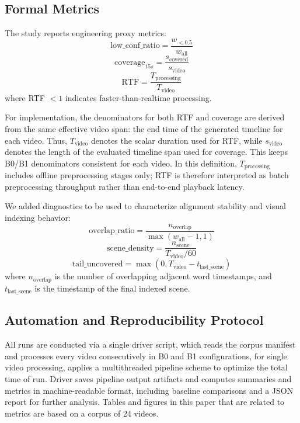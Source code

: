﻿﻿\documentclass[conference]{IEEEtran}
\begin{document}
\subsection{Formal Metrics}
The study reports engineering proxy metrics:
\begin{equation}
\text{low\_conf\_ratio} = \frac{w_{<0.5}}{w_{\text{all}}}
\end{equation}
\begin{equation}
\text{coverage}_{15s} = \frac{s_{\text{covered}}}{s_{\text{video}}}
\end{equation}
\begin{equation}
\text{RTF} = \frac{T_{\text{processing}}}{T_{\text{video}}}
\end{equation}
where RTF $< 1$ indicates faster-than-realtime processing.

For implementation, the denominators for both RTF and coverage are derived from the same effective video span: the end time of the generated timeline for each video. Thus, $T_{\text{video}}$ denotes the scalar duration used for RTF, while $s_{\text{video}}$ denotes the length of the evaluated timeline span used for coverage. This keeps B0/B1 denominators consistent for each video. In this definition, $T_{\text{processing}}$ includes offline preprocessing stages only; RTF is therefore interpreted as batch preprocessing throughput rather than end-to-end playback latency.

We added diagnostics to be used to characterize alignment stability and visual indexing behavior:
\begin{equation}
\text{overlap\_ratio} = \frac{n_{\text{overlap}}}{\max(w_{\text{all}}-1,1)}
\end{equation}
\begin{equation}
\text{scene\_density} = \frac{n_{\text{scene}}}{T_{\text{video}}/60}
\end{equation}
\begin{equation}
\text{tail\_uncovered} = \max(0, T_{\text{video}} - t_{\text{last\_scene}})
\end{equation}
where $n_{\text{overlap}}$ is the number of overlapping adjacent word timestamps, and $t_{\text{last\_scene}}$ is the timestamp of the final indexed scene.

\subsection{Automation and Reproducibility Protocol}
All runs are conducted via a single driver script, which reads the corpus manifest and processes every video consecutively in B0 and B1 configurations, for single video processing, applies a multithreaded pipeline scheme to optimize the total time of run. Driver saves pipeline output artifacts and computes summaries and metrics in machine-readable format, including baseline comparisons and a JSON report for further analysis. Tables and figures in this paper that are related to metrics are based on a corpus of 24 videos.
\end{document}
